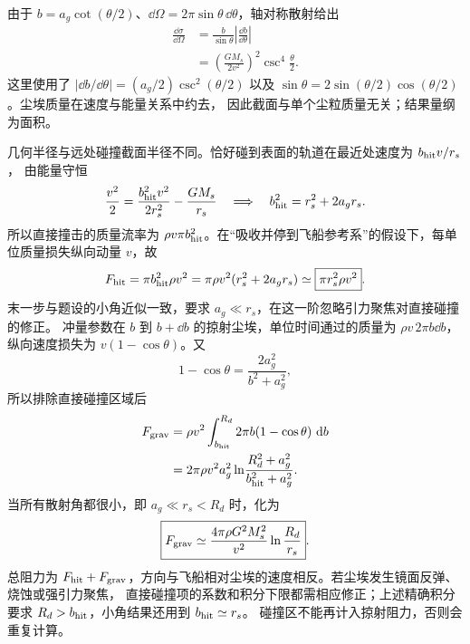 \begin{xesolution}
由于 $b=a_g\cot(\theta/2)$、$\dd\Omega=2\pi\sin\theta\,\dd\theta$，轴对称散射给出
\begin{align*}
 \frac{\dd\sigma}{\dd\Omega}
 &=\frac{b}{\sin\theta}\left|\frac{\dd b}{\dd\theta}\right|\\
 &=\boxed{\left(\frac{GM_s}{2v^2}\right)^2
 \csc^4\frac\theta2}.
\end{align*}
这里使用了 $|\dd b/\dd\theta|=(a_g/2)\csc^2(\theta/2)$ 以及
$\sin\theta=2\sin(\theta/2)\cos(\theta/2)$。尘埃质量在速度与能量关系中约去，
因此截面与单个尘粒质量无关；结果量纲为面积。

几何半径与远处碰撞截面半径不同。恰好碰到表面的轨道在最近处速度为 $b_{\rm hit}v/r_s$，
由能量守恒
\[
 \frac{v^2}{2}=\frac{b_{\rm hit}^2v^2}{2r_s^2}-\frac{GM_s}{r_s}
 \quad\Longrightarrow\quad b_{\rm hit}^2=r_s^2+2a_gr_s.
\]
所以直接撞击的质量流率为 $\rho v\pi b_{\rm hit}^2$。在“吸收并停到飞船参考系”的假设下，每单位质量损失纵向动量 $v$，故
\[
 F_{\rm hit}=\pi b_{\rm hit}^2\rho v^2
 =\pi\rho v^2(r_s^2+2a_gr_s)\simeq\boxed{\pi r_s^2\rho v^2}.
\]
末一步与题设的小角近似一致，要求 $a_g\ll r_s$，在这一阶忽略引力聚焦对直接碰撞的修正。
冲量参数在 $b$ 到 $b+\dd b$ 的掠射尘埃，单位时间通过的质量为
$\rho v\,2\pi b\dd b$，纵向速度损失为 $v(1-\cos\theta)$。又
\[
 1-\cos\theta=\frac{2a_g^2}{b^2+a_g^2},
\]
所以排除直接碰撞区域后
\begin{align*}
 F_{\rm grav}
 &=\rho v^2\int_{b_{\rm hit}}^{R_d}2\pi b(1-\cos\theta)\,\mathop{}\!\mathrm d b\\
 &=2\pi\rho v^2a_g^2
 \ln\!\frac{R_d^2+a_g^2}{b_{\rm hit}^2+a_g^2}.
\end{align*}
当所有散射角都很小，即 $a_g\ll r_s<R_d$ 时，化为
\[
 \boxed{F_{\rm grav}\simeq
 \frac{4\pi\rho G^2M_s^2}{v^2}\ln\frac{R_d}{r_s}}.
\]
总阻力为 $F_{\rm hit}+F_{\rm grav}$，方向与飞船相对尘埃的速度相反。若尘埃发生镜面反弹、烧蚀或强引力聚焦，
直接碰撞项的系数和积分下限都需相应修正；上述精确积分要求 $R_d>b_{\rm hit}$，小角结果还用到 $b_{\rm hit}\simeq r_s$。
碰撞区不能再计入掠射阻力，否则会重复计算。
\end{xesolution}

